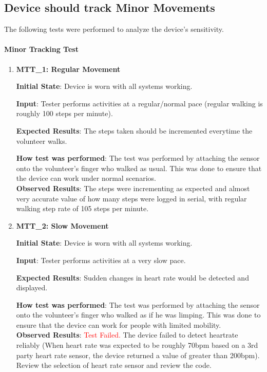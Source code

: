 \documentclass[12pt, titlepage]{article}
\begin{document}
\subsection{Device should track Minor Movements}
The following tests were performed to analyze the device's sensitivity.
\paragraph{Minor Tracking Test}
\begin{enumerate}
  \item{\textbf{MTT\_1: Regular Movement} \\}\label{MTT1}

  \textbf{Initial State}: Device is worn with all systems working.

  \textbf{Input}: Tester performs activities at a regular/normal pace (regular walking is roughly 100 steps per minute).

  \textbf{Expected Results}: The steps taken should be incremented everytime the volunteer walks.

  \textbf{How test was performed}: The test was performed by attaching the sensor onto the volunteer's finger who walked as usual. This was done to ensure that the device can work under normal scenarios.\\

  \textbf{Observed Results}: The steps were incrementing as expected and almost very accurate value of how many steps were logged in serial, with regular walking step rate of 105 steps per minute.

  \item{\textbf{MTT\_2: Slow Movement} \\}\label{MTT2}

  \textbf{Initial State}: Device is worn with all systems working.

  \textbf{Input}: Tester performs activities at a very slow pace.

  \textbf{Expected Results}: Sudden changes in heart rate would be detected and displayed.

  \textbf{How test was performed}: The test was performed by attaching the sensor onto the volunteer's finger who walked as if he was limping. This was done to ensure that the device can work for people with limited mobility.\\

  \textbf{Observed Results}: \textcolor{red}{Test Failed.} The device failed to detect heartrate reliably (When heart rate was expected to be roughly 70bpm based on a 3rd party heart rate sensor, the device returned a value of greater than 200bpm). Review the selection of heart rate sensor and review the code.

\end{enumerate}
\end{document}
